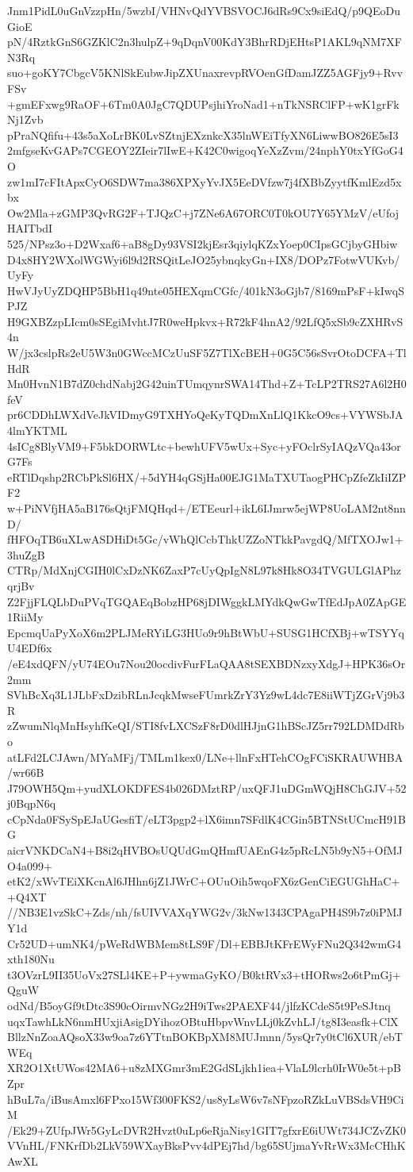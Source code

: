 Jnm1PidL0uGnVzzpHn/5wzbI/VHNvQdYVBSVOCJ6dRs9Cx9siEdQ/p9QEoDuGioE
pN/4RztkGnS6GZKlC2n3hulpZ+9qDqnV00KdY3BhrRDjEHtsP1AKL9qNM7XFN3Rq
suo+goKY7CbgcV5KNlSkEubwJipZXUnaxrevpRVOenGfDamJZZ5AGFjy9+RvvFSv
+gmEFxwg9RaOF+6Tm0A0JgC7QDUPsjhiYroNad1+nTkNSRClFP+wK1grFkNj1Zvb
pPraNQfifu+43s5aXoLrBK0LvSZtnjEXznkcX35lnWEiTfyXN6LiwwBO826E5sI3
2mfgseKvGAPs7CGEOY2ZIeir7lIwE+K42C0wigoqYeXzZvm/24nphY0txYfGoG4O
zw1mI7cFItApxCyO6SDW7ma386XPXyYvJX5EeDVfzw7j4fXBbZyytfKmlEzd5xbx
Ow2Mla+zGMP3QvRG2F+TJQzC+j7ZNe6A67ORC0T0kOU7Y65YMzV/eUfojHAITbdI
525/NPsz3o+D2Wxaf6+aB8gDy93VSI2kjEsr3qiylqKZxYoep0CIpsGCjbyGHbiw
D4x8HY2WXolWGWyi6l9d2RSQitLeJO25ybnqkyGn+IX8/DOPz7FotwVUKvb/UyFy
HwVJyUyZDQHP5BbH1q49nte05HEXqmCGfc/401kN3oGjb7/8169mPsF+kIwqSPJZ
H9GXBZzpLIcm0sSEgiMvhtJ7R0weHpkvx+R72kF4hnA2/92LfQ5xSb9cZXHRvS4n
W/jx3cslpRs2eU5W3n0GWccMCzUuSF5Z7TlXcBEH+0G5C56sSvrOtoDCFA+TlHdR
Mn0HvnN1B7dZ0chdNabj2G42uinTUmqynrSWA14Thd+Z+TcLP2TRS27A6l2H0feV
pr6CDDhLWXdVeJkVIDmyG9TXHYoQeKyTQDmXnLlQ1KkcO9cs+VYWSbJA4lmYKTML
4sICg8BlyVM9+F5bkDORWLtc+bewhUFV5wUx+Syc+yFOclrSyIAQzVQa43orG7Fs
eRTlDqshp2RCbPkSl6HX/+5dYH4qGSjHa00EJG1MaTXUTaogPHCpZfeZkIiIZPF2
w+PiNVfjHA5aB176sQtjFMQHqd+/ETEeurl+ikL6IJmrw5ejWP8UoLAM2nt8nnD/
fHFOqTB6uXLwASDHiDt5Gc/vWhQlCcbThkUZZoNTkkPavgdQ/MfTXOJw1+3huZgB
CTRp/MdXnjCGIH0lCxDzNK6ZaxP7cUyQpIgN8L97k8Hk8O34TVGULGlAPhzqrjBv
Z2FjjFLQLbDuPVqTGQAEqBobzHP68jDIWggkLMYdkQwGwTfEdJpA0ZApGE1RiiMy
EpcmqUaPyXoX6m2PLJMeRYiLG3HUo9r9hBtWbU+SUSG1HCfXBj+wTSYYqU4EDf6x
/eE4xdQFN/yU74EOu7Nou20ocdivFurFLaQAA8tSEXBDNzxyXdgJ+HPK36sOr2mm
SVhBcXq3L1JLbFxDzibRLnJcqkMwseFUmrkZrY3Yz9wL4dc7E8iiWTjZGrVj9b3R
zZwumNlqMnHsyhfKeQI/STI8fvLXCSzF8rD0dlHJjnG1hBScJZ5rr792LDMDdRbo
atLFd2LCJAwn/MYaMFj/TMLm1kex0/LNe+llnFxHTehCOgFCiSKRAUWHBA/wr66B
J79OWH5Qm+yudXLOKDFES4b026DMztRP/uxQFJ1uDGmWQjH8ChGJV+52j0BqpN6q
cCpNda0FSySpEJaUGesfiT/eLT3pgp2+lX6imn7SFdlK4CGin5BTNStUCmcH91BG
aicrVNKDCaN4+B8i2qHVBOsUQUdGmQHmfUAEnG4z5pRcLN5b9yN5+OfMJO4a099+
etK2/xWvTEiXKcnAl6JHhn6jZ1JWrC+OUuOih5wqoFX6zGenCiEGUGhHaC++Q4XT
//NB3E1vzSkC+Zds/nh/fsUIVVAXqYWG2v/3kNw1343CPAgaPH4S9b7z0iPMJY1d
Cr52UD+umNK4/pWeRdWBMem8tLS9F/Dl+EBBJtKFrEWyFNu2Q342wmG4xth180Nu
t3OVzrL9II35UoVx27SLl4KE+P+ywmaGyKO/B0ktRVx3+tHORws2o6tPmGj+QguW
odNd/B5oyGf9tDtc3S90cOirmvNGz2H9iTws2PAEXF44/jlfzKCdeS5t9PeSJtnq
uqxTawhLkN6nmHUxjiAsigDYihozOBtuHbpvWnvLLj0kZvhLJ/tg8I3easfk+ClX
BllzNnZoaAQsoX33w9oa7z6YTtnBOKBpXM8MUJmnn/5ysQr7y0tCl6XUR/ebTWEq
XR2O1XtUWos42MA6+u8zMXGmr3mE2GdSLjkh1iea+VlaL9lcrh0IrW0e5t+pBZpr
hBuL7a/iBusAmxl6FPxo15Wf300FKS2/us8yLsW6v7sNFpzoRZkLuVBSdsVH9CiM
/Ek29+ZUfpJWr5GyLcDVR2Hvzt0uLp6eRjaNisy1GIT7gfxrE6iUWt734JCZvZK0
VVnHL/FNKrfDb2LkV59WXayBksPvv4dPEj7hd/bg65SUjmaYvRrWx3McCHhKAwXL
